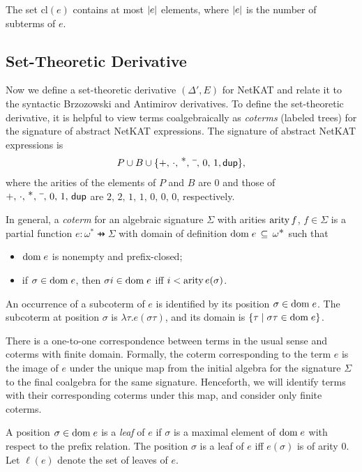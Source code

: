 \documentclass{article}
\newcommand\pdup{\mathop{\mathsf{dup}}}
\renewcommand\star{^{\textstyle *}}
\newcommand\clname{\mathrm{cl}}
\newcommand\cl[1]{\clname(#1)}
\begin{document}
\begin{lemma}
\label{eq:derivlinear}
The set $\cl e$ contains at most $|e|$ elements, where $|e|$ is the
number of subterms of $e$.
\end{lemma}
%
\subsection*{Set-Theoretic Derivative}

Now we define a set-theoretic derivative $(\Delta',E)$ for NetKAT and relate it to the syntactic Brzozowski and Antimirov derivatives.
To define the set-theoretic derivative, it is helpful to view terms coalgebraically as \emph{coterms} (labeled trees) for the signature of abstract NetKAT expressions. The signature of abstract NetKAT expressions is
\begin{align*}
P\cup B\cup\{+,\,\cdot,\,\star,\,\barnone,\,0,\,1,\pdup\},
\end{align*}
where the arities of the elements of $P$ and $B$ are $0$ and those of $+,\,\cdot,\,\star,\,\barnone,\,0,\,1,\,\pdup$ are $2,\,2,\,1,\,1,\,0,\,0,\,0$, respectively.

In general, a \emph{coterm} for an algebraic signature $\Sigma$ with arities $\mathrm{arity}\,f$, $f\in\Sigma$ is a partial function $e:\omega\star\pfun\Sigma$ with domain of definition $\dom e\subs\omega\star$ such that
\begin{itemize}
\item 
${\rm dom\;}e$ is nonempty and prefix-closed;
\item
if $\sigma\in{\rm dom\;}e$, then $\sigma i\in{\rm dom\;}e$ iff $i < \mathrm{arity}\,e(\sigma)$.
\end{itemize}
An occurrence of a subcoterm of $e$ is identified by its position $\sigma\in{\rm dom\;}e$.  The subcoterm at position $\sigma$ is $\lambda\tau.e(\sigma\tau)$, and its domain is $\{\tau \mid \sigma\tau\in{\rm dom\;}e\}$.

There is a one-to-one correspondence between terms in the usual sense and coterms with finite domain. Formally, the coterm corresponding to the term $e$ is the image of $e$ under the unique map from the initial algebra for the signature $\Sigma$ to the final coalgebra for the same signature. Henceforth, we will identify terms with their corresponding coterms under this map, and consider only finite coterms.

A position $\sigma\in{\rm dom\;}e$ is a \emph{leaf} of $e$ if $\sigma$ is a maximal element of ${\rm dom\;}e$ with respect to the prefix relation. The position $\sigma$ is a leaf of $e$ iff $e(\sigma)$ is of arity 0. Let $\ell(e)$ denote the set of leaves of $e$.
\end{document}
